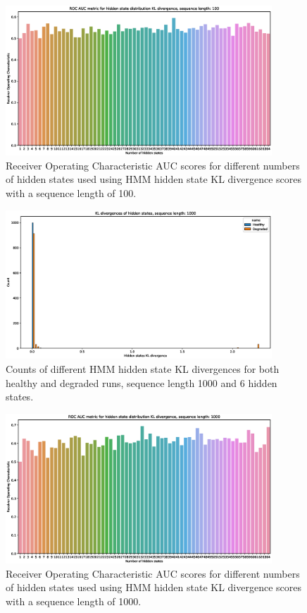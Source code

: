 \documentclass[journal]{IEEEtran}
\begin{document}
\begin{figure}[tb]
 \centering
 \includegraphics[width=10cm,keepaspectratio=true]{./roc_kl_score_100.eps}
 \caption{Receiver Operating Characteristic AUC scores for different numbers of hidden states used using HMM hidden state KL divergence scores with a sequence length of 100.}
 \label{figure:roc_kl_100}
\end{figure}

\begin{figure}[tb]
 \centering
 \includegraphics[width=10cm,keepaspectratio=true]{./kl_histograms_1000.eps}
 \caption{Counts of different HMM hidden state KL divergences for both healthy and degraded runs, sequence length 1000 and 6 hidden states.}
 \label{figure:kl_1000}
\end{figure}

\begin{figure}[tb]
 \centering
 \includegraphics[width=10cm,keepaspectratio=true]{./roc_kl_score_1000.eps}
 \caption{Receiver Operating Characteristic AUC scores for different numbers of hidden states used using HMM hidden state KL divergence scores with a sequence length of 1000.}
 \label{figure:roc_kl_1000}
\end{figure}
\end{document}
